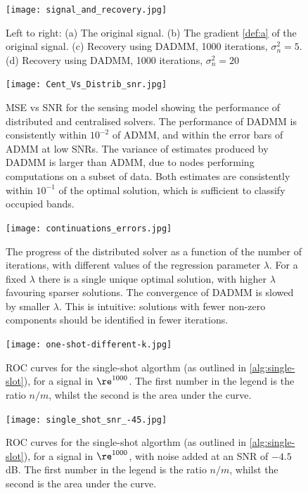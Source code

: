 \begin{figure}[h]
\centering
\texttt{[image: signal\_and\_recovery.jpg]}
\caption{Left to right: (a) The original signal. (b) The gradient \eqref{def:a} of the original signal. (c) Recovery using DADMM, 1000 iterations, \(\sigma^2_n = 5\). (d) Recovery using DADMM, 1000 iterations, \(\sigma^2_n = 20\)  }
\label{different_sigs}
\end{figure}

\begin{figure}[h]
\centering
\texttt{[image: Cent\_Vs\_Distrib\_snr.jpg]}
\caption{MSE vs SNR for the sensing model showing the performance of distributed and centralised solvers. The performance of DADMM is consistently within \(10^{-2}\) of ADMM, and within the error bars of ADMM at low SNRs. The variance of estimates produced by DADMM is larger than ADMM, due to nodes performing computations on a subset of data. Both estimates are consistently within \(10^{-1}\) of the optimal solution, which is sufficient to classify occupied bands.} 
\label{msevssnr0}
\end{figure}

\begin{figure}[h]
\centering
\texttt{[image: continuations\_errors.jpg]}
\caption{The progress of the distributed solver as a function of the number of iterations, with different values of the regression parameter \( \lambda \). For a fixed \( \lambda \) there is a single unique optimal solution, with higher \( \lambda \) favouring sparser solutions. The convergence of DADMM is slowed by smaller \( \lambda \). This is intuitive: solutions with fewer non-zero components should be identified in fewer iterations.}
\label{fig:differentLambda}
\end{figure}
 

\begin{figure}[h]
\centering
\texttt{[image: one-shot-different-k.jpg]}
\caption{ROC curves for the single-shot algorthm (as outlined in \ref{alg:single-slot}), for a signal in \(\re^{1000}\). The first number in the legend is the ratio \(n/m\), whilst the second is the area under the curve.}
\label{different_k}
\end{figure}


\begin{figure}[h]
\centering
\texttt{[image: single\_shot\_snr\_-45.jpg]}
\caption{ROC curves for the single-shot algorthm (as outlined in \ref{alg:single-slot}), for a signal in \(\re^{1000}\), with noise added at an SNR of \(-4.5\)dB. The first number in the legend is the ratio \(n/m\), whilst the second is the area under the curve.}
\label{different_k}
\end{figure}

